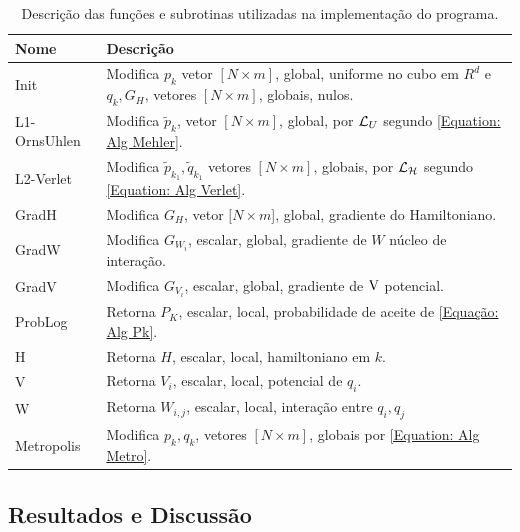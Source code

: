 \documentclass[12pt]{report}
\begin{document}
\begin{table}[ht]
	\centering
	\begin{tabular}{ |p{2.6cm}||p{12cm}|  }
		\hline
		Nome & Descrição \\ 
		\hline
		\hline
		Init   		  	 & 
		Modifica ${p}_{k}$ vetor $[N\times m]$, global, uniforme no cubo em $R^d$ e ${q}_{k}, G_H$, vetores $[N\times m]$, globais, nulos. \\
		\hline
		L1-OrnsUhlen 	 & 
		Modifica $\tilde{p}_k$, vetor $[N\times m]$, global, por $\operatorname{\mathcal{L}}_U$ segundo \ref{Equation: Alg Mehler}. \\
		\hline
		L2-Verlet  	 	 & 
		Modifica $\tilde{p}_{k_1},\tilde{q}_{k_1}$ vetores $[N\times m]$, globais, por $\operatorname{\mathcal{L}}_{\operatorname{\mathcal{H}}}$ segundo \ref{Equation: Alg Verlet}.	\\
		\hline
		GradH         	 & 
		Modifica $G_H$, vetor $[N\times m$], global, gradiente do Hamiltoniano.					\\
		\hline
		GradW        	 &
		Modifica $G_{W_i}$, escalar, global, gradiente de $W$ núcleo de interação.	\\
		\hline
		GradV  	      	 &
		Modifica $G_{V_i}$, escalar, global, gradiente de $\operatorname{V}$ potencial.		                    \\
		\hline
		ProbLog       		 &
		Retorna $P_K$, escalar, local, probabilidade de aceite de \ref{Equação: Alg Pk}. \\
		\hline
		H              	 &
		Retorna $H$, escalar, local, hamiltoniano em $k$.	 							\\
		\hline
		V  	      			 &
		Retorna $V_i$, escalar, local, potencial de $q_i$.								\\
		\hline
		W         	  		 & 
		Retorna $W_{i,j}$, escalar, local, interação entre $q_i,q_j$ 							\\
		\hline
		Metropolis     	 & 
		Modifica ${p}_{k},{q}_{k}$, vetores $[N\times m]$, globais por \ref{Equation: Alg Metro}.								\\
		\hline
	\end{tabular}
	\caption{ Descrição das funções e subrotinas utilizadas na implementação do programa.}
	\label{Table: Funcoes e Subrotinas}
\end{table}

\subsection{Resultados e Discussão}
\end{document}
